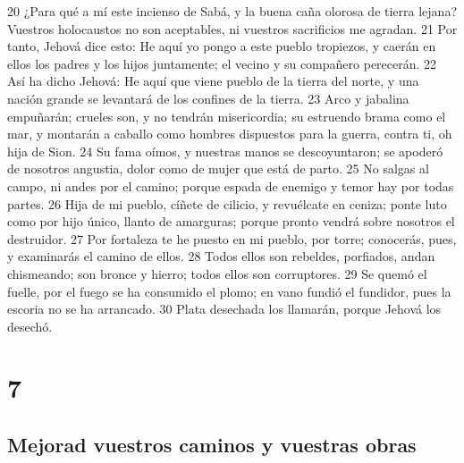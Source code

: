 20 ¿Para qué a mí este incienso de Sabá, y la buena caña olorosa de tierra lejana? Vuestros holocaustos no son aceptables, ni vuestros sacrificios me agradan.
21 Por tanto, Jehová dice esto: He aquí yo pongo a este pueblo tropiezos, y caerán en ellos los padres y los hijos juntamente; el vecino y su compañero perecerán.
22 Así ha dicho Jehová: He aquí que viene pueblo de la tierra del norte, y una nación grande se levantará de los confines de la tierra.
23 Arco y jabalina empuñarán; crueles son, y no tendrán misericordia; su estruendo brama como el mar, y montarán a caballo como hombres dispuestos para la guerra, contra ti, oh hija de Sion.
24 Su fama oímos, y nuestras manos se descoyuntaron; se apoderó de nosotros angustia, dolor como de mujer que está de parto.
25 No salgas al campo, ni andes por el camino; porque espada de enemigo y temor hay por todas partes.
26 Hija de mi pueblo, cíñete de cilicio, y revuélcate en ceniza; ponte luto como por hijo único, llanto de amarguras; porque pronto vendrá sobre nosotros el destruidor.
27 Por fortaleza te he puesto en mi pueblo, por torre; conocerás, pues, y examinarás el camino de ellos.
28 Todos ellos son rebeldes, porfiados, andan chismeando; son bronce y hierro; todos ellos son corruptores.
29 Se quemó el fuelle, por el fuego se ha consumido el plomo; en vano fundió el fundidor, pues la escoria no se ha arrancado.
30 Plata desechada los llamarán, porque Jehová los desechó.

\chapter{7}

\section*{Mejorad vuestros caminos y vuestras obras}

